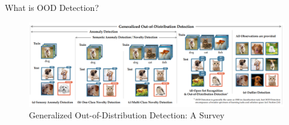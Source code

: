 \documentclass[aspectratio=169]{beamer}
\begin{document}



\begin{frame}{What is OOD Detection?}
    \begin{figure}
        \centering
        \includegraphics[scale=0.3]{images/OOD_ex_new.png}
        \caption{Generalized Out-of-Distribution Detection: A Survey}
        \label{fig:my_label}
    \end{figure}
\end{frame}
\end{document}
